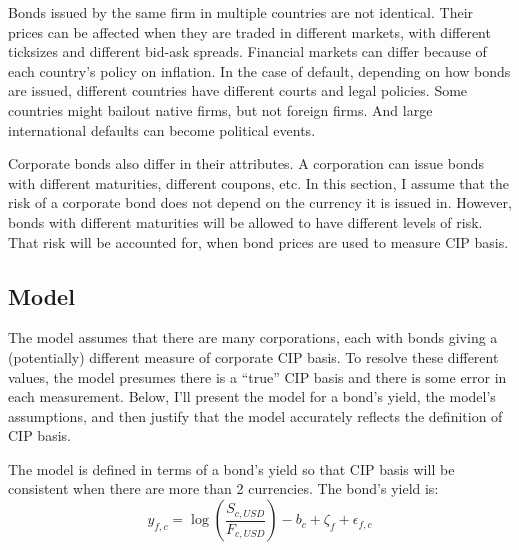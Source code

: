 
Bonds issued by the same firm in multiple countries are not identical.  Their prices can be affected when they are traded in different markets, with different ticksizes and different bid-ask spreads.  Financial markets can differ because of each country's policy on inflation.  In the case of default, depending on how bonds are issued, different countries have different courts and legal policies.  Some countries might bailout native firms, but not foreign firms.  And large international defaults can become political events.  

Corporate bonds also differ in their attributes.  A corporation can issue bonds with different maturities, different coupons, etc.  In this section, I assume that the risk of a corporate bond does not depend on the currency it is issued in.  However, bonds with different maturities will be allowed to have different levels of risk.  That risk will be accounted for, when bond prices are used to measure CIP basis.




\subsection{Model} \label{corp_cip_model}

The model assumes that there are many corporations, each with bonds giving a (potentially) different measure of corporate CIP basis.  To resolve these different values, the model presumes there is a ``true'' CIP basis and there is some error in each measurement.  Below, I'll present the model for a bond's yield, the model's assumptions, and then justify that the model accurately reflects the definition of CIP basis.

The model is defined in terms of a bond's yield so that CIP basis will be consistent when there are more than 2 currencies.  The bond's yield is:
\begin{equation}
  \label{first_model}
 y_{f,c} = \log\left(\frac{S_{c,USD}}{F_{c,USD}}\right) - b_{c} + \zeta_{f} + \epsilon_{f,c} 
\end{equation}

